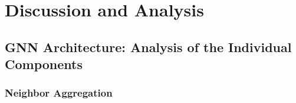 \documentclass{article}
\begin{document}



\section{Discussion and Analysis}


\subsection{GNN Architecture: Analysis of the Individual Components}


\subsubsection{Neighbor Aggregation}
\end{document}
